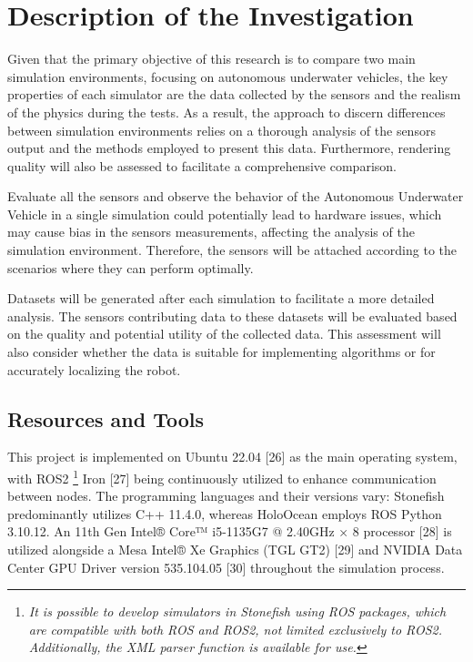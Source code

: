 \documentclass[]{article}
\begin{document}
	\textbf{}
	
	\newpage
	
	\section{Description of the Investigation}
	
	
	
	Given that the primary objective of this research is to compare two main simulation environments, focusing on autonomous underwater vehicles, the key properties of each simulator are the data collected by the sensors and the realism of the physics during the tests. As a result, the approach to discern differences between simulation environments relies on a thorough analysis of the sensors output and the methods employed to present this data. Furthermore, rendering quality will also be assessed to facilitate a comprehensive comparison.
	
	Evaluate all the sensors and observe the behavior of the Autonomous Underwater Vehicle in a single simulation could potentially lead to hardware issues, which may cause bias in the sensors measurements, affecting the analysis of the simulation environment. Therefore, the sensors will be attached according to the scenarios where they can perform optimally.
	
	Datasets will be generated after each simulation to facilitate a more detailed analysis. The sensors contributing data to these datasets will be evaluated based on the quality and potential utility of the collected data. This assessment will also consider whether the data is suitable for implementing algorithms or for accurately localizing the robot.
	
	\subsection{Resources and Tools}
	
	This project is implemented on Ubuntu 22.04 [26] as the main operating system, with ROS2 \footnote[6]{ \textit{It is possible to develop simulators in Stonefish using ROS packages, which are compatible with both ROS and ROS2, not limited exclusively to ROS2. Additionally, the XML parser function is available for use.}} Iron [27] being continuously utilized to enhance communication between nodes. The programming languages and their versions vary: Stonefish predominantly utilizes C++ 11.4.0, whereas HoloOcean employs ROS Python 3.10.12. An 11th Gen Intel® Core™ i5-1135G7 @ 2.40GHz × 8 processor [28] is utilized alongside a Mesa Intel® Xe Graphics (TGL GT2) [29] and NVIDIA Data Center GPU Driver version 535.104.05 [30] throughout the simulation process.
	
\end{document}
